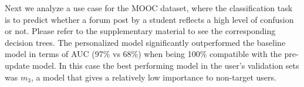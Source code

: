 \documentclass[letterpaper]{article} %
\theoremstyle{definition}
\begin{document}



%


Next we analyze a use case for the MOOC dataset, where the classification task is to predict whether a forum post by a student reflects a high level of confusion or not. Please refer to the supplementary material to see the corresponding decision trees. The personalized model significantly outperformed the baseline model in terms of AUC (97\% vs 68\%) when being 100\% compatible with the pre-update model. In this case the best performing model in the user's validation sets was $m_3$, a model that gives a relatively low importance to non-target users.
\end{document}
